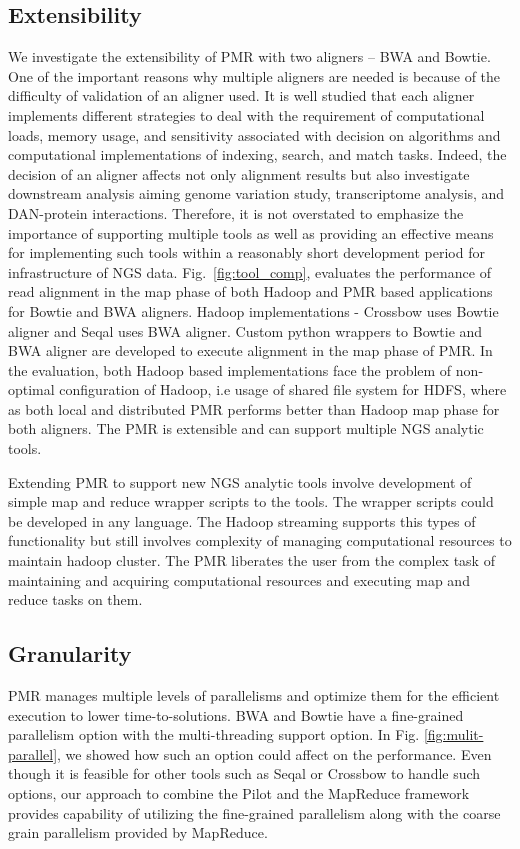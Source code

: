 \documentclass{acm_proc_article-sp}
\begin{document}
\subsection{Extensibility}

We investigate the extensibility of PMR with two aligners -- BWA and
Bowtie.  One of the important reasons why multiple aligners are needed
is because of the difficulty of validation of an aligner used.  It is
well studied that each aligner implements different strategies to deal
with the requirement of computational loads, memory usage, and
sensitivity associated with decision on algorithms and computational
implementations of indexing, search, and match
tasks\cite{mapping-survey}. Indeed, the decision of an aligner affects
not only alignment results but also investigate downstream analysis
aiming genome variation study, transcriptome analysis, and DAN-protein
interactions. Therefore, it is not overstated to emphasize the
importance of supporting multiple tools as well as providing an
effective means for implementing such tools within a reasonably short
development period for infrastructure of NGS data.
Fig.~\ref{fig:tool_comp}, evaluates the performance of read alignment
in the map phase of both Hadoop and PMR based applications for Bowtie
and BWA aligners. Hadoop implementations - Crossbow uses Bowtie
aligner and Seqal uses BWA aligner.  Custom python wrappers to Bowtie
and BWA aligner are developed to execute alignment in the map phase of
PMR. In the evaluation, both Hadoop based implementations face the
problem of non-optimal configuration of Hadoop, i.e usage of shared
file system for HDFS, where as both local and distributed PMR performs
better than Hadoop map phase for both aligners. The PMR is extensible
and can support multiple NGS analytic tools.

Extending PMR to support new NGS analytic tools involve development of simple map and reduce wrapper scripts to the tools. The wrapper scripts could be developed in any language. 
The Hadoop streaming supports this types of functionality but still involves complexity of managing computational resources to maintain hadoop cluster.
The PMR liberates the user from the complex task of maintaining and acquiring computational resources and executing map and reduce tasks on them.

\subsection{Granularity} 
PMR manages multiple levels of parallelisms and optimize them for the
efficient execution to lower time-to-solutions. BWA and Bowtie have a
fine-grained parallelism option with the multi-threading support
option.  In Fig. \ref{fig:mulit-parallel}, we showed how such an option could affect
on the performance.  Even though it is feasible for other tools such
as Seqal or Crossbow to handle such options, our approach to combine
the Pilot and the MapReduce framework provides capability of utilizing
the fine-grained parallelism along with the coarse grain parallelism
provided by MapReduce.%
\end{document}

